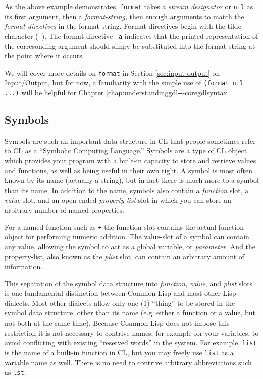 \documentclass [11pt]{book}
\begin{document}
As the above example demonstrates, \texttt{format} takes a \emph{stream designator} or \texttt{nil} as its first argument, then a \emph{format-string}, then enough arguments to match the \emph{format directives} in the format-string. Format directives begin with the
tilde character (\texttt{~}).  The format-directive \texttt{~a} indicates that the printed representation of the corresonding argument should simpy be 
substituted into the format-string at the point where it occurs.



We will cover more details on \texttt{format} in Section 
\ref{sec:input-output} on Input/Output, but for now, a familiarity with the simple use of \texttt{(format nil ...)} will be helpful for Chapter 
\ref{chap:understandinggdl---coregdlsyntax}.



\subsection{Symbols}

\label{subsec:symbols}



Symbols are such an important data structure in CL that people
sometimes refer to CL as a ``Symbolic Computing Language.'' Symbols
are a type of CL object which provides your program with a built-in
capacity to store and retrieve values and functions, as well as being
useful in their own right. A symbol is most often known by its name
 (actually a string), but in fact there is much more to a symbol than
its name. In addition to the name, symbols also contain a \emph{function} slot, a \emph{value} slot, and an open-ended \emph{property-list} slot in which you can store an arbitrary number of named properties.



For a named function such as \texttt{+} the function-slot contains the actual function
object for performing numeric addition. The value-slot of a symbol can
contain any value, allowing the symbol to act as a global variable, or \emph{parameter}. And the property-list, also known as the \emph{plist} slot, can contain an arbitrary amount of information.



This separation of the symbol data structure into \emph{function}, \emph{value}, and \emph{plist} slots is one fundamental distinction between Common Lisp
and most other Lisp dialects. Most other dialects allow only one (1)
``thing'' to be stored in the symbol data structure, other than its
name (e.g. either a function or a value, but not both at the same
time). Because Common Lisp does not impose this restriction it is not
necessary to contrive names, for example for your variables, to avoid
conflicting with existing ``reserved words'' in the system. For
example, \texttt{list} is the name of a built-in function in CL, but you may
freely use \texttt{list} as a variable name as well. There is no need to
contrive arbitrary abbreviations such as \texttt{lst}.
\end{document}
